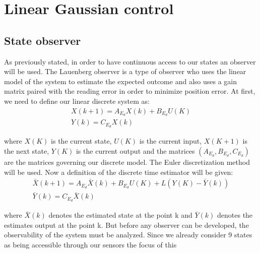 \documentclass[twocolumn,showpacs,
    nofootinbib,aps,superscriptaddress,
    eqsecnum,prd,showkeys,10pt,floatfix]{revtex4}
\begin{document}
\section{Linear Gaussian control}

\subsection{State observer}
As previously stated, in order to have continuous access to our states an
observer will be used. The Lauenberg observer is a type of observer who uses
the linear model of the system to estimate the expected outcome and also uses a
gain matrix paired with the reading error in order to minimize position error.
At first, we need to define our linear discrete system as:
\begin{align}
    X(k+1)=A_{E_d}X(k)+B_{E_d}U(K) \\
    Y(k)=C_{E_d}X(k)
    \label{LinearDiscreteExtendedSystemFormula}
\end{align}
\par
where $X(K)$ is the current state, $U(K)$ is the current input, $X(K+1)$ is the
next state, $Y(K)$ is the current output and the matrices
$(A_{E_d},B_{E_d},C_{E_d})$ are the matrices governing our discrete model. The
Euler discretization method will be used. Now a definition of the discrete time
estimator will be given:
\begin{align}
    \bar{X}(k+1)=A_{E_d}\bar{X}(k)+B_{E_d}U(K)+L(Y(K)-\bar{Y}(k)) \\
    \bar{Y}(k)=C_{E_d}\bar{X}(k)
    \label{LinearEstimatorDiscreteExtendedSystemFormula}
\end{align}
\par
where $\bar{X}(k)$ denotes the estimated state at the point k and $\bar{Y}(k)$
denotes the estimates output at the point k. But before any observer can be
developed, the observability of the system must be analyzed. Since we already
consider 9 states as being accessible through our sensors the focus of this
\end{document}
